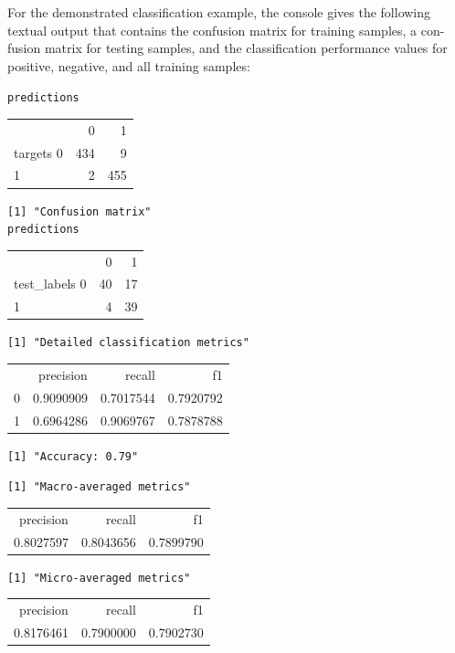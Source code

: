 For the demonstrated classification example, the console gives the following textual output that contains the confusion matrix for training samples, a con-\\
fusion matrix for testing samples, and the classification performance values for positive, negative, and all training samples:

\begin{flushleft}
\texttt{predictions} \\
\begin{tabular}{lrr}
                   & 0 & 1 \\
targets 0 & 434 & 9   \\
1         & 2   & 455 \\
\end{tabular}

\texttt{[1] "Confusion matrix"} \\
\texttt{predictions} \\
\begin{tabular}{lrr}
                           & 0 & 1 \\
test\_labels 0 & 40  & 17  \\
1             & 4   & 39  \\
\end{tabular}

\texttt{[1] "Detailed classification metrics"} \\
\begin{tabular}{lrrr}
  & precision & recall & f1 \\
0 & 0.9090909 & 0.7017544 & 0.7920792 \\
1 & 0.6964286 & 0.9069767 & 0.7878788 \\
\end{tabular}

\texttt{[1] "Accuracy: 0.79"}

\texttt{[1] "Macro-averaged metrics"} \\
\begin{tabular}{rrr}
precision & recall & f1 \\
0.8027597 & 0.8043656 & 0.7899790 \\
\end{tabular}

\texttt{[1] "Micro-averaged metrics"} \\
\begin{tabular}{rrr}
precision & recall & f1 \\
0.8176461 & 0.7900000 & 0.7902730 \\
\end{tabular}
\end{flushleft}

